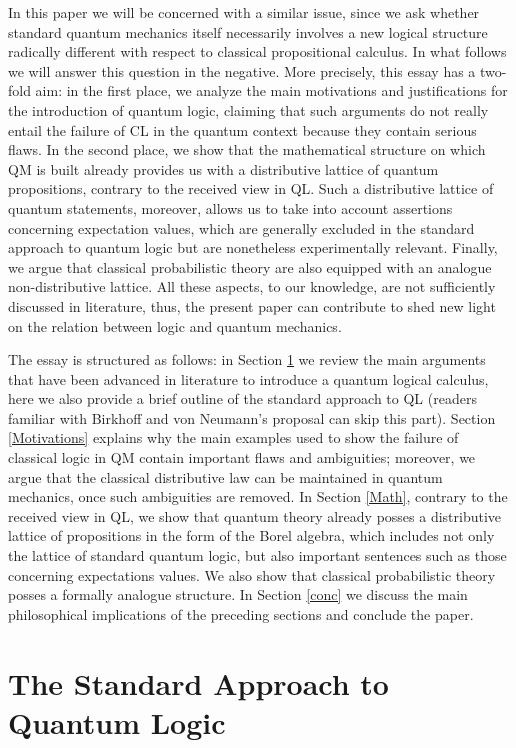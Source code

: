 \documentclass[11pt, executivepaper]{article}
\begin{document}
In this paper we will be concerned with a similar issue, since we ask whether standard quantum mechanics itself necessarily involves a new logical structure radically different with respect to classical propositional calculus. In what follows we will answer this question in the negative. More precisely, this essay has a two-fold aim: in the first place, we analyze the main motivations and justifications for the introduction of quantum logic, claiming that such arguments do not really entail the failure of CL in the quantum context because they contain serious flaws. In the second place, we show that the mathematical structure on which QM is built already provides us with a distributive lattice of quantum propositions, contrary to the received view in QL. Such a distributive lattice of quantum statements, moreover, allows us to take into account assertions concerning expectation values, which are generally excluded in the standard approach to quantum logic but are nonetheless experimentally relevant. Finally, we argue that classical probabilistic theory are also equipped with an analogue non-distributive lattice. All these aspects, to our knowledge, are not sufficiently discussed in literature, thus, the present paper can contribute to shed new light on the relation between logic and quantum mechanics.
\vspace{2mm}

The essay is structured as follows: in Section \ref{QL} we review the main arguments that have been advanced in literature to introduce a quantum logical calculus, here we also provide a brief outline of the standard approach to QL (readers familiar with Birkhoff and von Neumann's proposal can skip this part). Section \ref{Motivations} explains why the main examples used to show the failure of classical logic in QM contain important flaws and ambiguities; moreover, we argue that the classical distributive law can be maintained in quantum mechanics, once such ambiguities are removed. In Section \ref{Math}, contrary to the received view in QL, we show that quantum theory already posses a distributive lattice of propositions in the form of the Borel algebra, which includes not only the lattice of standard quantum logic, but also important sentences such as those concerning expectations values. We also show that classical probabilistic theory posses a formally analogue structure. In Section \ref{conc} we discuss the main philosophical implications of the preceding sections and conclude the paper.

\section{The Standard Approach to Quantum Logic}
\label{QL}
\end{document}

